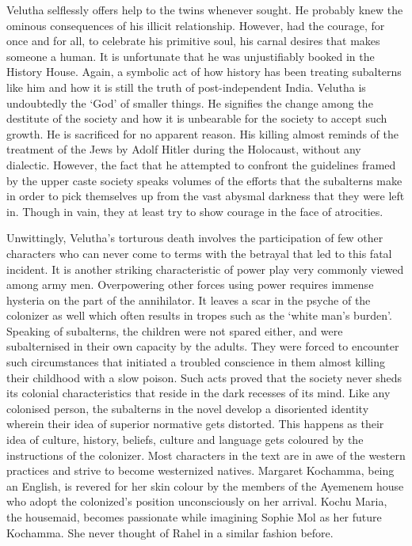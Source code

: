Velutha selflessly offers help to the twins whenever sought. He probably knew the ominous consequences of his illicit relationship. However, had the courage, for once and for all, to celebrate his primitive soul, his carnal desires that makes someone a human. It is unfortunate that he was unjustifiably booked in the History House. Again, a symbolic act of how history has been treating subalterns like him and how it is still the truth of post-independent India. Velutha is undoubtedly the `God' of smaller things. He signifies the change among the destitute of the society and how it is unbearable for the society to accept such growth. He is sacrificed for no apparent reason. His killing almost reminds of the treatment of the Jews by Adolf Hitler during the Holocaust, without any dialectic. However, the fact that he attempted to confront the guidelines framed by the upper caste society speaks volumes of the efforts that the subalterns make in order to pick themselves up from the vast abysmal darkness that they were left in. Though in vain, they at least try to show courage in the face of atrocities.

Unwittingly, Velutha's torturous death involves the participation of few other characters who can never come to terms with the betrayal that led to this fatal incident. It is another striking characteristic of power play very commonly viewed among army men. Overpowering other forces using power requires immense hysteria on the part of the annihilator. It leaves a scar in the psyche of the colonizer as well which often results in tropes such as the `white man's burden'. Speaking of subalterns, the children were not spared either, and were subalternised in their own capacity by the adults. They were forced to encounter such circumstances that initiated a troubled conscience in them almost killing their childhood with a slow poison. Such acts proved that the society never sheds its colonial characteristics that reside in the dark recesses of its mind. Like any colonised person, the subalterns in the novel develop a disoriented identity wherein their idea of superior normative gets distorted. This happens as their idea of culture, history, beliefs, culture and language gets coloured by the instructions of the colonizer. Most characters in the text are in awe of the western practices and strive to become westernized natives. Margaret Kochamma, being an English, is revered for her skin colour by the members of the Ayemenem house who adopt the colonized's position unconsciously on her arrival. Kochu Maria, the housemaid, becomes passionate while imagining Sophie Mol as her future Kochamma. She never thought of Rahel in a similar fashion before.

